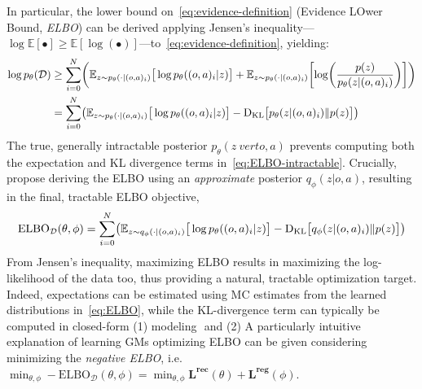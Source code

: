 In particular, the lower bound on~\ref{eq:evidence-definition} (Evidence LOwer Bound, \emph{ELBO}) can be derived applying Jensen's inequality---\(\log \mathbb{E}[\bullet] \geq \mathbb{E} [\log (\bullet)] \)---to~\ref{eq:evidence-definition}, yielding:
\begin{align}
    \log p_\theta(\mathcal D) &\geq \sum_{i=0}^{N} \left(
            \mathbb{E}_{z \sim p_\theta(\cdot \vert (o,a)_i)} \big[ \log p_\theta((o,a)_i \vert z) \big]
            + \mathbb{E}_{z \sim p_\theta(\cdot \vert (o,a)_i)} \left[ \log \left( \frac{p(z)}{p_\theta(z \vert (o,a)_i)} \right) \right]
        \right) \\
        &= \sum_{i=0}^{N} \left(
            \mathbb{E}_{z \sim p_\theta(\cdot \vert (o,a)_i)} \big[ \log p_\theta((o,a)_i \vert z) \big]
        - \DKL \big[ p_\theta(z \vert (o,a)_i) \Vert p(z) \big]
        \right) \label{eq:ELBO-intractable}
\end{align}
The true, generally intractable posterior \( p_\theta (z \ vert o,a) \) prevents computing both the expectation and KL divergence terms in~\ref{eq:ELBO-intractable}.
Crucially,~\citet{kingmaAutoEncodingVariationalBayes2022} propose deriving the ELBO using an \emph{approximate} posterior \( q_\phi(z \vert o,a) \), resulting in the final, tractable ELBO objective,
\begin{align}
\text{ELBO}_{\mathcal D}(\theta, \phi) = \sum_{i=0}^{N} \left(
            \mathbb{E}_{z \sim q_\phi(\cdot \vert (o,a)_i)} \big[ \log p_\theta((o,a)_i \vert z) \big]
        - \DKL \big[ q_\phi(z \vert (o,a)_i) \Vert p(z) \big]
        \right)
        \label{eq:ELBO}
\end{align}
From Jensen's inequality, maximizing ELBO results in maximizing the log-likelihood of the data too, thus providing a natural, tractable optimization target.
Indeed, expectations can be estimated using MC estimates from the learned distributions in~\ref{eq:ELBO}, while the KL-divergence term can typically be computed in closed-form (1) modeling  \( \) and (2) 
A particularly intuitive explanation of learning GMs optimizing ELBO can be given considering minimizing the \emph{negative ELBO}, i.e. \( \min_{\theta, \phi} - \text{ELBO}_{\mathcal D}(\theta, \phi) = \min_{\theta, \phi}\mathbf{L^{\text{rec}}}(\theta) + \mathbf{L^{\text{reg}}}(\phi) \).

